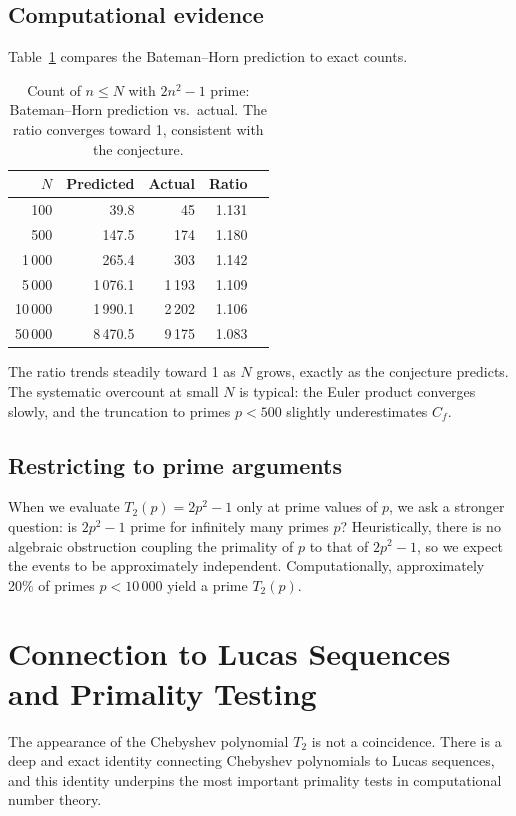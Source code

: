 \documentclass[11pt,a4paper]{article}
\begin{document}
\subsection{Computational evidence}

Table~\ref{tab:bh} compares the Bateman--Horn prediction to exact counts.

\begin{table}[h]
\centering
\begin{tabular}{rrrrr}
\toprule
$N$ & Predicted & Actual & Ratio \\
\midrule
100 & 39.8 & 45 & 1.131 \\
500 & 147.5 & 174 & 1.180 \\
1\,000 & 265.4 & 303 & 1.142 \\
5\,000 & 1\,076.1 & 1\,193 & 1.109 \\
10\,000 & 1\,990.1 & 2\,202 & 1.106 \\
50\,000 & 8\,470.5 & 9\,175 & 1.083 \\
\bottomrule
\end{tabular}
\caption{Count of $n \leq N$ with $2n^2 - 1$ prime: Bateman--Horn prediction vs.\ actual. The ratio converges toward 1, consistent with the conjecture.}
\label{tab:bh}
\end{table}

The ratio trends steadily toward 1 as $N$ grows, exactly as the conjecture predicts. The systematic overcount at small $N$ is typical: the Euler product converges slowly, and the truncation to primes $p < 500$ slightly underestimates $C_f$.

\subsection{Restricting to prime arguments}

When we evaluate $T_2(p) = 2p^2 - 1$ only at prime values of $p$, we ask a stronger question: is $2p^2 - 1$ prime for infinitely many primes $p$? Heuristically, there is no algebraic obstruction coupling the primality of $p$ to that of $2p^2 - 1$, so we expect the events to be approximately independent. Computationally, approximately 20\% of primes $p < 10\,000$ yield a prime $T_2(p)$.

\section{Connection to Lucas Sequences and Primality Testing}

The appearance of the Chebyshev polynomial $T_2$ is not a coincidence. There is a deep and exact identity connecting Chebyshev polynomials to Lucas sequences, and this identity underpins the most important primality tests in computational number theory.
\end{document}
